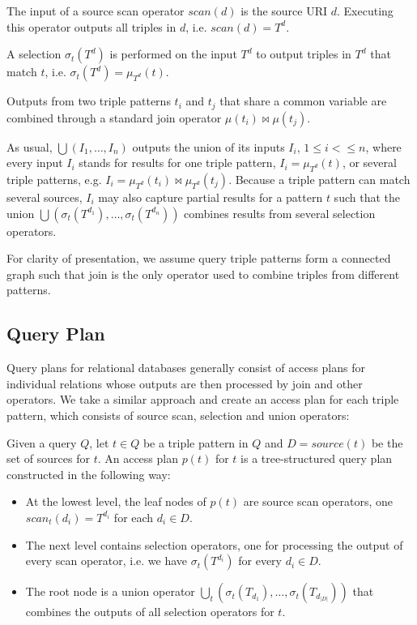 \begin{definition} The input of a source scan operator $scan(d)$ is the source URI $d$.
Executing this operator outputs all triples in $d$, i.e. $scan(d) = T^d$.
\end{definition}

\begin{definition}[Selection]  A selection $\sigma_t(T^d)$ is performed on the input $T^d$ to output
triples in $T^d$ that match $t$, i.e. $\sigma_t(T^d) = \mu_{T^d}(t)$. 
\end{definition}

Outputs from two triple patterns $t_i$ and $t_j$ that share a common variable are combined through a standard join operator $\mu(t_i)\Join\mu(t_j)$. 

\begin{definition}[Union] As usual, $\bigcup(I_1,\ldots,I_n)$
outputs the union of its inputs $I_i$, $1\leq i < \leq n$, where every input $I_i$ stands for results for one triple pattern, $I_i = \mu_{T^d}(t)$, or several triple patterns, e.g. $I_i = \mu_{T^d}(t_i)\Join\mu_{T^d}(t_j)$. Because a triple pattern can match several sources, $I_i$ may also capture partial results for a pattern $t$ such that the union
$\bigcup(\sigma_t(T^{d_1}),\ldots,\sigma_t(T^{d_n}))$ combines results from several selection operators.   
\end{definition}

For clarity of presentation, we assume query triple patterns form a connected graph such that join is the only operator used to combine triples from different patterns. 


\subsection{Query Plan}
\label{sec:basicshape}
Query plans for relational databases generally consist of access plans
for individual relations whose outputs are then processed by join and
other operators. We take a similar approach and create an
access plan for each triple pattern, which consists of source scan, selection and union
operators:

\begin{definition}
  Given a query $Q$, let $t \in Q$ be a triple pattern in $Q$ and $D = source(t)$ be the set of sources for $t$. An access plan $p(t)$ for $t$ is a tree-structured query plan constructed in the
  following way:
  \begin{itemize}
  \item At the lowest level, the leaf nodes of $p(t)$ are source scan operators, one
    $scan_t(d_i) = T^{d_i}$ for each $d_i \in D$.
  \item The next level contains selection operators, one
    for processing the output of every scan operator, i.e. we have $\sigma_t(T^{d_i})$ for every $d_i \in D$.     
   \item The root node is a union operator $\bigcup_t(\sigma_t(T_{d_1}),\ldots,\sigma_t(T_{d_{|D|}}))$ that combines the outputs of all selection operators for $t$.    
  \end{itemize}
\end{definition}

